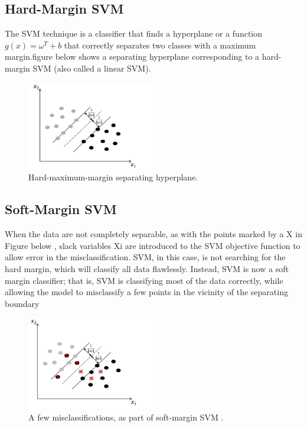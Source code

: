 \subsection{Hard-Margin SVM}
The SVM technique is a classifier that finds a hyperplane or a function $g(x) = {\omega}^T +  b$   that correctly separates two classes with a maximum margin.figure below shows a separating hyperplane corresponding to a hard-margin SVM (also called a linear SVM).

\begin{figure}[H]
\centering
\includegraphics[width=0.5\textwidth]{img/hardmargin.PNG}
\caption{ Hard-maximum-margin separating hyperplane. }
\label{125 }
\end{figure}


\subsection{Soft-Margin SVM}

When the data are not completely separable, as with the points marked by a X in Figure below  , slack variables Xi  are introduced to the SVM objective function to allow error in the misclassification. SVM, in this case, is not searching for the hard margin, which will classify all data flawlessly. Instead, SVM is now a soft margin classifier; that is, SVM is classifying most of the data correctly, while allowing the model to misclassify a few points in the vicinity of the separating boundary

\begin{figure}[H]
\centering
\includegraphics[width=0.5\textwidth]{img/softmargin.PNG}
\caption{  A few misclassifications, as part of soft-margin SVM . }
\label{126 }
\end{figure}


